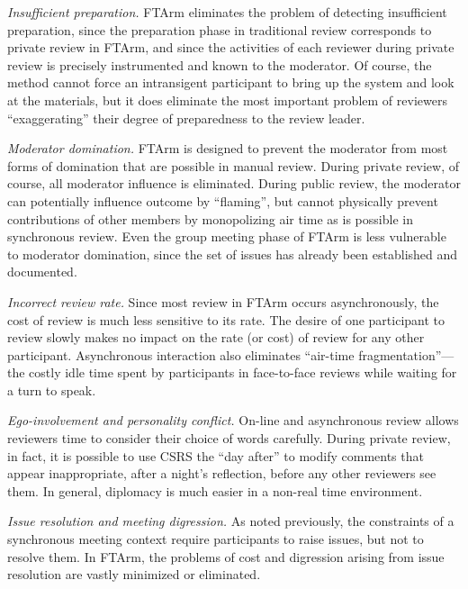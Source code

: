 \begin{itemizenoindent}
  
\item {\em Insufficient preparation.} FTArm eliminates the problem of
  detecting insufficient preparation, since the preparation phase in
  traditional review corresponds to private review in FTArm, and since the
  activities of each reviewer during private review is precisely
  instrumented and known to the moderator.  Of course, the method cannot
  force an intransigent participant to bring up the system and look at the
  materials, but it does eliminate the most important problem of reviewers
  ``exaggerating'' their degree of preparedness to the review leader. 
  
\item {\em Moderator domination.} FTArm is designed to prevent the
  moderator from most forms of domination that are possible in manual review.
  During private review, of course, all moderator influence is eliminated.
  During public review, the moderator can potentially influence outcome by
  ``flaming'', but cannot physically prevent contributions of other members
  by monopolizing air time as is possible in synchronous review.  Even the
  group meeting phase of FTArm is less vulnerable to moderator domination,
  since the set of issues has already been established and documented.
  
\item {\em Incorrect review rate.} Since most review in FTArm occurs
  asynchronously, the cost of review is much less sensitive to its rate.
  The desire of one participant to review slowly makes no impact on the
  rate (or cost) of review for any other participant.  Asynchronous
  interaction also eliminates ``air-time fragmentation''---the costly idle
  time spent by participants in face-to-face reviews while waiting
  for a turn to speak.
  
\item {\em Ego-involvement and personality conflict.} On-line and
  asynchronous review allows reviewers time to consider their choice of
  words carefully.  During private review, in fact, it is possible to use
  CSRS the ``day after'' to modify comments that appear inappropriate,
  after a night's reflection, before any other reviewers see them.  In
  general, diplomacy is much easier in a non-real time environment.
  
\item {\em Issue resolution and meeting digression.} As noted previously,
  the constraints of a synchronous meeting context require participants to
  raise issues, but not to resolve them.  In FTArm, the problems of cost and
  digression arising from issue resolution are vastly minimized or
  eliminated.  
  

\end{itemizenoindent}
